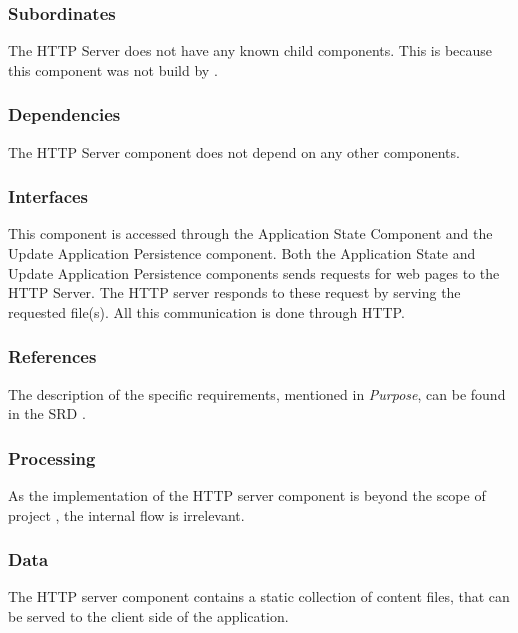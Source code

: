 \subsubsection*{Subordinates}
The HTTP Server does not have any known child components. This is because this component was not build by \projectauthor.

\subsubsection*{Dependencies}
The HTTP Server component does not depend on any other components.

\subsubsection*{Interfaces}
This component is accessed through the Application State Component and the Update Application Persistence component. Both the Application State and Update Application Persistence components sends requests for web pages to the HTTP Server. The HTTP server responds to these request by serving the requested file(s). All this communication is done through HTTP.

\subsubsection*{References}
The description of the specific requirements, mentioned in \emph{Purpose}, can be found in the SRD \cite{srd}.

\subsubsection*{Processing}
As the implementation of the HTTP server component is beyond the scope of project \projectname, the internal flow is irrelevant.

\subsubsection*{Data}
The HTTP server component contains a static collection of content files, that can be served to the client side of the application.

